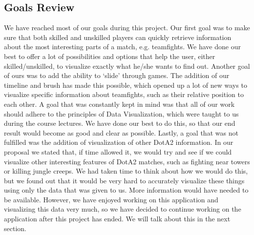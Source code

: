 \documentclass[11pt,twoside,a4paper]{article}
\begin{document}
\subsection{Goals Review}
We have reached most of our goals during this project. Our first goal was to make sure that both skilled and unskilled players can quickly retrieve information about the most interesting parts of a match, e.g. teamfights. We have done our best to offer a lot of possibilities and options that help the user, either skilled/unskilled, to visualize exactly what he/she wants to find out.\newline
Another goal of ours was to add the ability to `slide' through games. The addition of our timeline and brush has made this possible, which opened up a lot of new ways to visualize specific information about teamfights, such as their relative position to each other.
\newline
A goal that was constantly kept in mind was that all of our work should adhere to the principles of Data Visualization, which were taught to us during the course lectures. We have done our best to do this, so that our end result would become as good and clear as possible.
\newline\newline
Lastly, a goal that was not fulfilled was the addition of visualization of other DotA2 information. In our proposal we stated that, if time allowed it, we would try and see if we could visualize other interesting features of DotA2 matches, such as fighting near towers or killing jungle creeps. We had taken time to think about how we would do this, but we found out that it would be very hard to accurately visualize these things using only the data that was given to us. More information would have needed to be available.
However, we have enjoyed working on this application and visualizing this data very much, so we have decided to continue working on the application after this project has ended. We will talk about this in the next section.
\end{document}
